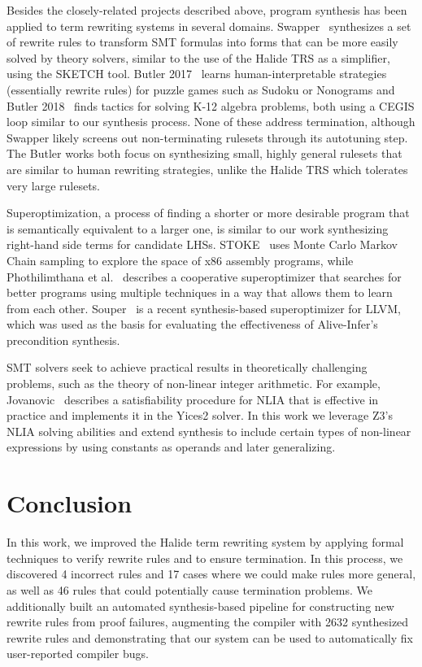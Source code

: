 \documentclass[acmsmall,review,anonymous]{acmart}\settopmatter{printfolios=true,printccs=false,printacmref=false}
\newcommand{\NumRulesFixed}{{\color{black} 4}\xspace}
\newcommand{\NumPredicatesRelaxed}{{\color{black} 17}\xspace}
\newcommand{\NumOrderingProblems}{{\color{black} 46}\xspace}
\newcommand{\NumRulesSynthesized}{{\color{black} 2632}\xspace}
\begin{document}
Besides the closely-related projects described above, program synthesis has been applied to term rewriting systems in several domains. Swapper~\cite{singh2016swapper} synthesizes a set of rewrite rules to transform SMT formulas into forms that can be more easily solved by theory solvers, similar to the use of the Halide TRS as a simplifier, using the SKETCH tool. Butler 2017~\cite{butler2017synthesizing} learns human-interpretable strategies (essentially rewrite rules) for puzzle games such as Sudoku or Nonograms and Butler 2018~\cite{butler2018framework} finds tactics for solving K-12 algebra problems, both using a CEGIS loop similar to our synthesis process. None of these address termination, although Swapper likely screens out non-terminating rulesets through its autotuning step. The Butler works both focus on synthesizing small, highly general rulesets that are similar to human rewriting strategies, unlike the Halide TRS which tolerates very large rulesets.

Superoptimization, a process of finding a shorter or more desirable program that is semantically equivalent to a larger one, is similar to our work synthesizing right-hand side terms for candidate LHSs. STOKE~\cite{schkufza2013stochastic} uses Monte Carlo Markov Chain sampling to explore the space of x86 assembly programs, while Phothilimthana et al.~\cite{phothilimthana2016scaling} describes a cooperative superoptimizer that searches for better programs using multiple techniques in a way that allows them to learn from each other.  Souper~\cite{sasnauskas2017souper} is a recent synthesis-based superoptimizer for LLVM, which was used as the basis for evaluating the effectiveness of Alive-Infer's precondition synthesis.

SMT solvers seek to achieve practical results in theoretically challenging problems, such as the theory of non-linear integer arithmetic. For example, Jovanovic~\cite{jovanovic2017solving} describes a satisfiability procedure for NLIA that is effective in practice and implements it in the Yices2 solver. In this work we leverage Z3's NLIA solving abilities and extend synthesis to include certain types of non-linear expressions by using constants as operands and later generalizing.

\section{Conclusion}
In this work, we improved the Halide term rewriting system by applying formal
techniques to verify rewrite rules and to ensure termination.  In this process,
we discovered \NumRulesFixed incorrect rules and \NumPredicatesRelaxed cases
where we could make rules more general, as well as \NumOrderingProblems rules
that could potentially cause termination problems.  We additionally built
an automated synthesis-based pipeline for constructing new rewrite rules from
proof failures, augmenting the compiler with \NumRulesSynthesized synthesized
rewrite rules and demonstrating that our system can be used to automatically fix
user-reported compiler bugs.
\end{document}

